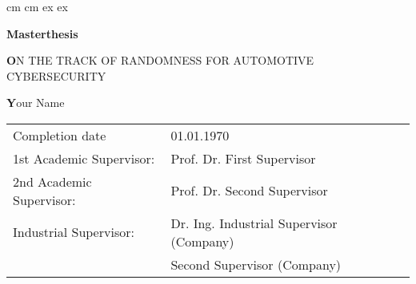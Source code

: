 
 cm                
 cm
\topmargin -15mm
 ex 			
 ex
\raggedbottom
\oddsidemargin -6.5mm    	
\evensidemargin -16.5mm 
%
\newcommand{\thesis}{Masterthesis}
\newcommand{\writer}{Your Name}
\newcommand{\completiondate}{01.01.1970}
\newcommand{\topic}{ON THE TRACK OF RANDOMNESS FOR AUTOMOTIVE CYBERSECURITY}
\newcommand{\supervisor}{Prof. Dr. First Supervisor}
\newcommand{\supervisorsec}{Prof. Dr. Second Supervisor}
\newcommand{\supervisorindustrial}{Dr. Ing. Industrial Supervisor (Company)}
\newcommand{\supervisorindustrialsec}{Second Supervisor (Company)}
\thispagestyle{empty} 
\vspace{-20mm}
\begin{minipage}[t]{8cm}  
\end{minipage}
\hfill
\vspace{30mm}
\begin{center}{\Huge \textbf{\thesis}} \par
\vspace{20mm} \baselineskip 35pt
{\LARGE\textbf  \topic} \par
\vspace{16mm}
{\LARGE\textbf  \writer} \par
\end{center}
% 
\vspace{20mm}
\vfill
\begin{tabular}{lp{382pt}}
Completion date	 		 &  \completiondate \\[5ex]
1st Academic Supervisor:	 &  \supervisor \\[0.5ex]
2nd Academic Supervisor:	 &  \supervisorsec \\[0.5ex]
Industrial Supervisor:	 &  \supervisorindustrial \\ 
					     & 	\supervisorindustrialsec
\end{tabular}
\newpage
\thispagestyle{empty}
\rule[0ex]{0ex}{0ex} 	
\newpage
\thispagestyle{empty} 

